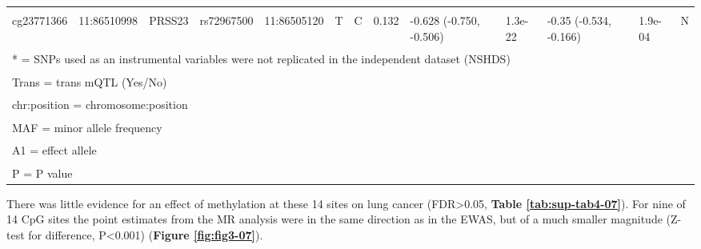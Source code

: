 \documentclass[11pt,oneside]{bristolthesis}
\begin{document}
\begin{landscape}
\begin{table}[!h]
{\begin{tabular}[t]{lllllllllllll}
\cellcolor{gray!6}{cg11660018} & \cellcolor{gray!6}{11:86510915} & \cellcolor{gray!6}{PRSS23} & \cellcolor{gray!6}{rs1939110} & \cellcolor{gray!6}{11:86515072} & \cellcolor{gray!6}{T} & \cellcolor{gray!6}{C} & \cellcolor{gray!6}{0.286} & \cellcolor{gray!6}{-0.404 (-0.498, -0.309)} & \cellcolor{gray!6}{2.6e-16} & \cellcolor{gray!6}{-0.229 (-0.385, -0.073)} & \cellcolor{gray!6}{4.0e-03} & \cellcolor{gray!6}{N}\\
\addlinespace
cg23771366 & 11:86510998 & PRSS23 & rs72967500 & 11:86505120 & T & C & 0.132 & -0.628 (-0.750, -0.506) & 1.3e-22 & -0.35 (-0.534, -0.166) & 1.9e-04 & N\\
\bottomrule
\multicolumn{13}{l}{\textsuperscript{} * = SNPs used as an instrumental variables were not replicated in the independent dataset (NSHDS)}\\
\multicolumn{13}{l}{\textsuperscript{} Trans = trans mQTL (Yes/No)}\\
\multicolumn{13}{l}{\textsuperscript{} chr:position = chromosome:position}\\
\multicolumn{13}{l}{\textsuperscript{} MAF = minor allele frequency}\\
\multicolumn{13}{l}{\textsuperscript{} A1 = effect allele}\\
\multicolumn{13}{l}{\textsuperscript{} P = P value}\\
\end{tabular}}
\end{table}
\end{landscape}
There was little evidence for an effect of methylation at these 14 sites on lung cancer (FDR\textgreater0.05, \textbf{Table \ref{tab:sup-tab4-07}}). For nine of 14 CpG sites the point estimates from the MR analysis were in the same direction as in the EWAS, but of a much smaller magnitude (Z-test for difference, P\textless0.001) (\textbf{Figure \ref{fig:fig3-07}}).
\end{document}
